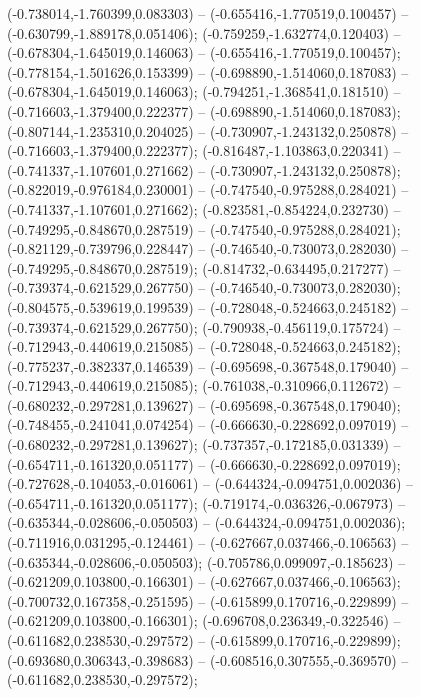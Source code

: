  (-0.738014,-1.760399,0.083303) -- (-0.655416,-1.770519,0.100457) -- (-0.630799,-1.889178,0.051406);
 (-0.759259,-1.632774,0.120403) -- (-0.678304,-1.645019,0.146063) -- (-0.655416,-1.770519,0.100457);
 (-0.778154,-1.501626,0.153399) -- (-0.698890,-1.514060,0.187083) -- (-0.678304,-1.645019,0.146063);
 (-0.794251,-1.368541,0.181510) -- (-0.716603,-1.379400,0.222377) -- (-0.698890,-1.514060,0.187083);
 (-0.807144,-1.235310,0.204025) -- (-0.730907,-1.243132,0.250878) -- (-0.716603,-1.379400,0.222377);
 (-0.816487,-1.103863,0.220341) -- (-0.741337,-1.107601,0.271662) -- (-0.730907,-1.243132,0.250878);
 (-0.822019,-0.976184,0.230001) -- (-0.747540,-0.975288,0.284021) -- (-0.741337,-1.107601,0.271662);
 (-0.823581,-0.854224,0.232730) -- (-0.749295,-0.848670,0.287519) -- (-0.747540,-0.975288,0.284021);
 (-0.821129,-0.739796,0.228447) -- (-0.746540,-0.730073,0.282030) -- (-0.749295,-0.848670,0.287519);
 (-0.814732,-0.634495,0.217277) -- (-0.739374,-0.621529,0.267750) -- (-0.746540,-0.730073,0.282030);
 (-0.804575,-0.539619,0.199539) -- (-0.728048,-0.524663,0.245182) -- (-0.739374,-0.621529,0.267750);
 (-0.790938,-0.456119,0.175724) -- (-0.712943,-0.440619,0.215085) -- (-0.728048,-0.524663,0.245182);
 (-0.775237,-0.382337,0.146539) -- (-0.695698,-0.367548,0.179040) -- (-0.712943,-0.440619,0.215085);
 (-0.761038,-0.310966,0.112672) -- (-0.680232,-0.297281,0.139627) -- (-0.695698,-0.367548,0.179040);
 (-0.748455,-0.241041,0.074254) -- (-0.666630,-0.228692,0.097019) -- (-0.680232,-0.297281,0.139627);
 (-0.737357,-0.172185,0.031339) -- (-0.654711,-0.161320,0.051177) -- (-0.666630,-0.228692,0.097019);
 (-0.727628,-0.104053,-0.016061) -- (-0.644324,-0.094751,0.002036) -- (-0.654711,-0.161320,0.051177);
 (-0.719174,-0.036326,-0.067973) -- (-0.635344,-0.028606,-0.050503) -- (-0.644324,-0.094751,0.002036);
 (-0.711916,0.031295,-0.124461) -- (-0.627667,0.037466,-0.106563) -- (-0.635344,-0.028606,-0.050503);
 (-0.705786,0.099097,-0.185623) -- (-0.621209,0.103800,-0.166301) -- (-0.627667,0.037466,-0.106563);
 (-0.700732,0.167358,-0.251595) -- (-0.615899,0.170716,-0.229899) -- (-0.621209,0.103800,-0.166301);
 (-0.696708,0.236349,-0.322546) -- (-0.611682,0.238530,-0.297572) -- (-0.615899,0.170716,-0.229899);
 (-0.693680,0.306343,-0.398683) -- (-0.608516,0.307555,-0.369570) -- (-0.611682,0.238530,-0.297572);
